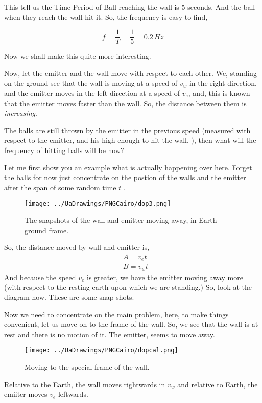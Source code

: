 \documentclass[a4paper]{article}
\begin{document}
This tell us the Time Period of Ball reaching the wall is 5 seconds. And the ball when they reach the wall hit it. 
So, the frequency is easy to find, 
\begin{tcolorbox}
    \begin{equation}
        f = \frac{1}{T} = \frac{1}{5} = 0.2 \, Hz
        \end{equation}  
\end{tcolorbox} 
 Now we shall make this quite more interesting. 
 \begin{tcolorbox}
     Now, let the emitter and the wall move with respect to each other. We, standing on the ground see that the wall is moving 
     at a speed of $v_w$ in the right direction, and the emitter moves in the left direction at a speed of $v_e$, and, this is known
     that the emitter moves faster than the wall. So, the distance between them is \emph{increasing}. 

     The balls are still thrown by the emitter in the previous speed (measured with respect to the emitter, and his high enough to hit the wall,
     ), then what will the 
     frequency of hitting balls will be now?
 \end{tcolorbox} 
Let me first show you an example what is actually happening over here. Forget the balls for now just concentrate on the postion 
of the walls and the emitter after the span of some random time $t$ . 
\begin{figure} [hbtp]
    \centering
    \texttt{[image: ../UaDrawings/PNGCairo/dop3.png]}
    \caption{The snapshots of the wall and emitter moving away, in Earth ground frame.}
    \label{ }
\end{figure} 

So, the distance moved by wall and emitter is, 
\begin{align}
    &A = v_e t \\
    &B = v_w t 
\end{align} 
And because the speed $v_e$ is greater, we have the emitter moving away more (with respect to the resting earth upon which we are standing.)
So, look at the diagram now. These are some snap shots. 

Now we need to concentrate on the main problem, here, to make things convenient, let us move on to the frame of the 
wall. So, we see that the wall is at rest and there is no motion of it. The emitter, seems to move away. 
\begin{figure} [hbtp]
    \centering
    \texttt{[image: ../UaDrawings/PNGCairo/dopcal.png]}
    \caption{Moving to the special frame of the wall.}  
    \label{ }
\end{figure} 
Relative to the Earth, the wall moves rightwards in $v_w$ and relative to Earth, the emiiter moves $v_e$ leftwards. 
\end{document}

